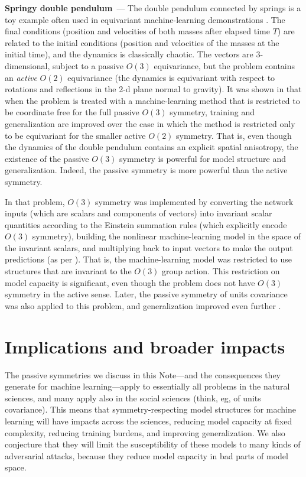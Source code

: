 \documentclass{article}
\renewcommand{\paragraph}[1]{\par\textbf{#1}~---}
\begin{document}
\paragraph{Springy double pendulum}
The double pendulum connected by springs is a toy example often used in equivariant machine-learning demonstrations \cite{finzi2021practical,yao2021simple}. 
The final conditions (position and velocities of both masses after elapsed time $T$) are related to the initial conditions (position and velocities of the masses at the initial time), and the dynamics is classically chaotic.
The vectors are 3-dimensional, subject to a passive $O(3)$ equivariance, but the problem contains an \emph{active} $O(2)$ equivariance (the dynamics is equivariant with respect to rotations and reflections in the 2-d plane normal to gravity).
It was shown in \cite{yao2021simple} that when the problem is treated with a machine-learning method that is restricted to be coordinate free for the full passive $O(3)$ symmetry, training and generalization are improved over the case in which the method is restricted only to be equivariant for the smaller active $O(2)$ symmetry.
That is, even though the dynamics of the double pendulum contains an explicit spatial anisotropy, the existence of the passive $O(3)$ symmetry is powerful for model structure and generalization.
Indeed, the passive symmetry is more powerful than the active symmetry.

In that problem, $O(3)$ symmetry was implemented by converting the network inputs (which are scalars and components of vectors) into invariant scalar quantities according to the Einstein summation rules (which explicitly encode $O(3)$ symmetry), building the nonlinear machine-learning model in the space of the invariant scalars, and multiplying back to input vectors to make the output predictions (as per \cite{villar2021scalars}).
That is, the machine-learning model was restricted to use structures that are invariant to the $O(3)$ group action.
This restriction on model capacity is significant, even though the problem does not have $O(3)$ symmetry in the active sense.
Later, the passive symmetry of units covariance was also applied to this problem, and generalization improved even further \cite{villar2022dimensionless}.

\section{Implications and broader impacts}

The passive symmetries we discuss in this Note---and the consequences they generate for machine learning---apply to essentially all problems in the natural sciences, and many apply also in the social sciences (think, eg, of units covariance).
This means that symmetry-respecting model structures for machine learning will have impacts across the sciences, reducing model capacity at fixed complexity, reducing training burdens, and improving generalization.
We also conjecture that they will limit the susceptibility of these models to many kinds of adversarial attacks, because they reduce model capacity in bad parts of model space.
\end{document}
